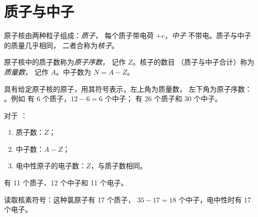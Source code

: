 \section{质子与中子}

\begin{definition}[质子、中子与核子]\label{def:g9:inside-the-atom:proton}
原子核由两种粒子组成：\emph{质子}，
每个质子带电荷 $+e$，\emph{中子}
不带电。质子与中子的质量几乎相同，
二者合称为\emph{核子}。
\end{definition}

\begin{definition}[原子序数与质量数]\label{def:g9:inside-the-atom:atomic-number}
原子核中的质子数称为\emph{原子序数}，
记作 $Z$。核子的数目
（质子与中子合计）称为\emph{质量数}，
记作 $A$。中子数为 $N = A - Z$。
\end{definition}

\begin{notation}[核素符号]\label{not:g9:inside-the-atom:symbol}
具有给定原子核的原子，用其符号表示，左上角为质量数，
左下角为原子序数：
。例如  有 6 个质子，$12 - 6 =
6$ 个中子； 有 26 个质子和 30 个中子。
\end{notation}

\begin{method}[读取核素符号]\label{met:g9:inside-the-atom:read}
对于 ：
\begin{enumerate}
  \item 质子数：$Z$；
  \item 中子数：$A - Z$；
  \item 电中性原子的电子数：$Z$，与质子数相同。
\end{enumerate}
 有 11 个质子、12 个中子和 11 个电子。
\end{method}

\begin{omfigure}

{\small 读取核素符号：这种氯原子有 17 个质子，
$35 - 17 = 18$ 个中子，电中性时有 17 个电子。}
\end{omfigure}

